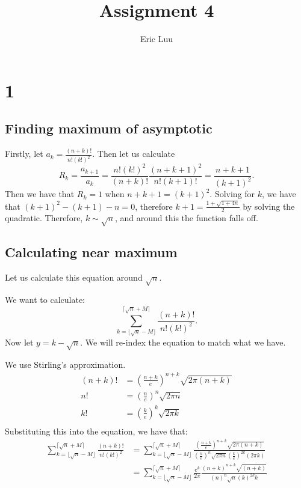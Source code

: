\documentclass[]{article}
\title{Assignment 4}
\author{Eric Luu}
\begin{document}
\maketitle
\section{1}
\subsection{Finding maximum of asymptotic}
Firstly, let $a_k = \frac{(n + k)!}{n!(k!)^2}$. Then let us calculate 
\begin{equation}
	R_k = \frac{a_{k + 1}}{a_k} = \frac{n!(k!)^2}{(n + k)!}\frac{(n + k + 1)^2}{n! (k + 1)!} = \frac{n + k + 1}{(k + 1)^2}. 
\end{equation}
Then we have that $R_k = 1$ when $n + k + 1 = (k + 1)^2$. Solving for $k$, we have that $(k + 1)^2 - (k + 1) - n = 0$, therefore $k + 1 = \frac{1 + \sqrt{1 + 4n}}{2}$ by solving the quadratic. Therefore, $k \sim \sqrt{n}$, and around this the function falls off. 
\subsection{Calculating near maximum}
Let us calculate this equation around $\sqrt{n}$. 

We want to calculate:
\begin{equation}
	\sum_{k = \lfloor \sqrt{n} - M \rfloor }^{ \lceil \sqrt{n} + M \rceil}  \frac{(n + k)!}{n!(k!)^2}.
\end{equation}
Now let $y = k - \sqrt{n}$. We will re-index the equation to match what we have.

We use Stirling's approximation.
\begin{align*}
	(n + k)! &= \left(\frac{n + k}{e}\right)^{n + k}\sqrt{2\pi (n + k)}\\
	n! &= \left(\frac{n}{e}\right)^n \sqrt{2 \pi n}\\
	k! &= \left(\frac{k}{e}\right)^k \sqrt{2 \pi k}\\
\end{align*}
Substituting this into the equation, we have that:
\begin{align*}
	\sum_{k = \lfloor \sqrt{n} - M \rfloor }^{ \lceil \sqrt{n} + M \rceil}  \frac{(n + k)!}{n!(k!)^2}
	&=
	\sum_{k = \lfloor \sqrt{n} - M \rfloor }^{ \lceil \sqrt{n} + M \rceil} \frac{\left(\frac{n + k}{e}\right)^{n + k}\sqrt{2\pi (n + k)}}{\left(\frac{n}{e}\right)^n \sqrt{2 \pi n} \left(\frac{k}{e}\right)^{2k} (2 \pi k)}\\
	&=
	\sum_{k = \lfloor \sqrt{n} - M \rfloor }^{ \lceil \sqrt{n} + M \rceil} \frac{e^{k}}{2\pi} \frac{\left(n + k\right)^{n + k}\sqrt{(n + k)}}{\left(n\right)^n \sqrt{n} \left(k\right)^{2k}k }\\
\end{align*}
\end{document}

